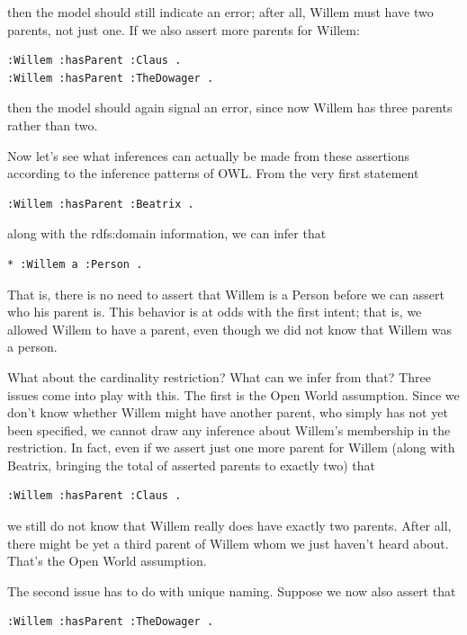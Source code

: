 then the model should still indicate an error; after all, Willem must
have two parents, not just one. If we also assert more parents for
Willem:

\begin{lstlisting}
:Willem :hasParent :Claus .
:Willem :hasParent :TheDowager .
\end{lstlisting}

then the model should again signal an error, since now Willem has three
parents rather than two.

Now let's see what inferences can actually be made from these assertions
according to the inference patterns of OWL. From the very first
statement

\begin{lstlisting}
:Willem :hasParent :Beatrix .
\end{lstlisting}

along with the rdfs:domain information, we can infer that

\begin{lstlisting}
* :Willem a :Person .
\end{lstlisting}

That is, there is no need to assert that Willem is a Person before we
can assert who his parent is. This behavior is at odds with the first
intent; that is, we allowed Willem to have a parent, even though we did
not know that Willem was a person.

What about the cardinality restriction? What can we infer from that?
Three issues come into play with this. The first is the Open World
assumption. Since we don't know whether Willem might have another
parent, who simply has not yet been specified, we cannot draw any
inference about Willem's membership in the restriction. In fact, even if
we assert just one more parent for Willem (along with Beatrix, bringing
the total of asserted parents to exactly two) that

\begin{lstlisting}
:Willem :hasParent :Claus .
\end{lstlisting}

we still do not know that Willem really does have exactly two parents.
After all, there might be yet a third parent of Willem whom we just
haven't heard about. That's the Open World assumption.

The second issue has to do with unique naming. Suppose we now also
assert that

\begin{lstlisting}
:Willem :hasParent :TheDowager .
\end{lstlisting}

